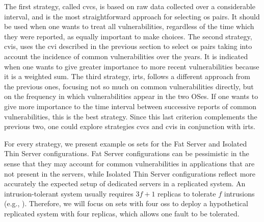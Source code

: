The first strategy, called \gls{cvcs}, is based on raw data collected over a considerable interval, and is the most straightforward approach for selecting \gls{os} pairs. 
It should be used when one wants to treat all vulnerabilities, regardless of the time which they were reported, as equally important to make choices. 
The second strategy, \gls{cvis}, uses the \gls{cvi} described in the previous section to select \gls{os} pairs taking into account the incidence of common vulnerabilities over the years. 
It is indicated when one wants to give greater importance to more recent vulnerabilities because it is a weighted sum. 
The third strategy, \gls{irts}, follows a different approach from the previous ones, focusing not so much on common vulnerabilities directly, but on the frequency in which vulnerabilities appear in the two OSes. If one wants to give more importance to the time interval between successive reports of common vulnerabilities, this is the best strategy. 
Since this last criterion complements the previous two, one could explore strategies \gls{cvcs} and \gls{cvis} in conjunction with \gls{irts}.

For every strategy, we present example \gls{os} sets for the Fat Server and Isolated Thin Server configurations. 
Fat Server configurations can be pessimistic in the sense that they may account for common vulnerabilities in applications that are not present in the servers, while Isolated Thin Server configurations reflect more accurately the expected setup of dedicated servers in a replicated system. 
An intrusion-tolerant system usually requires $3f+1$ replicas to tolerate $f$ intrusions (e.g., \cite{Verissimo:2003,Castro:2002,Bessani:2008,Moniz:2011}). 
Therefore, we will focus on sets with four \glspl{os} to deploy a hypothetical replicated system with four replicas, which allows one fault to be tolerated.

